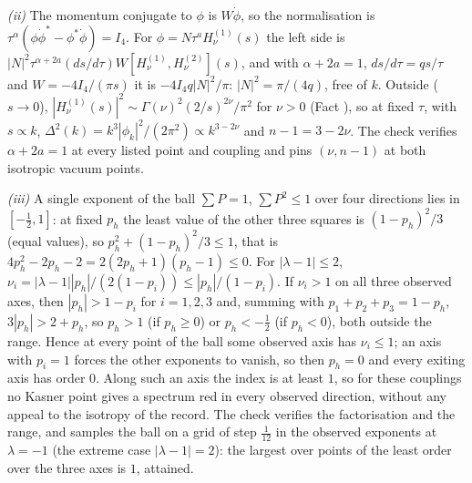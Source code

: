\emph{(ii)} The momentum conjugate to $\phi$ is $W\dot\phi$, so the normalisation is $\tau^{\alpha}(\phi\dot\phi^{*} - \phi^{*}\dot\phi) = I_{4}$. For $\phi = N\tau^{a}H^{(1)}_{\nu}(s)$ the left side is $|N|^{2}\tau^{\alpha + 2a}(ds/d\tau)W[H^{(1)}_{\nu}, H^{(2)}_{\nu}](s)$, and with $\alpha + 2a = 1$, $ds/d\tau = qs/\tau$ and $W = -4I_{4}/(\pi s)$ it is $-4I_{4} q|N|^{2}/\pi$: $|N|^{2} = \pi/(4q)$, free of $k$. Outside ($s \to 0$), $|H^{(1)}_{\nu}(s)|^{2} \sim \Gamma(\nu)^{2}(2/s)^{2\nu}/\pi^{2}$ for $\nu > 0$ (Fact ), so at fixed $\tau$, with $s \propto k$, $\Delta^{2}(k) = k^{3}|\phi_{k}|^{2}/(2\pi^{2}) \propto k^{3 - 2\nu}$ and $n - 1 = 3 - 2\nu$. The check verifies $\alpha + 2a = 1$ at every listed point and coupling and pins $(\nu, n - 1)$ at both isotropic vacuum points.

\emph{(iii)} A single exponent of the ball $\sum P = 1$, $\sum P^{2} \le 1$ over four directions lies in $[-\tfrac12, 1]$: at fixed $p_{h}$ the least value of the other three squares is $(1 - p_{h})^{2}/3$ (equal values), so $p_{h}^{2} + (1 - p_{h})^{2}/3 \le 1$, that is $4p_{h}^{2} - 2p_{h} - 2 = 2(2p_{h} + 1)(p_{h} - 1) \le 0$. For $|\lambda - 1| \le 2$, $\nu_{i} = |\lambda - 1||p_{h}|/(2(1 - p_{i})) \le |p_{h}|/(1 - p_{i})$. If $\nu_{i} > 1$ on all three observed axes, then $|p_{h}| > 1 - p_{i}$ for $i = 1, 2, 3$ and, summing with $p_{1} + p_{2} + p_{3} = 1 - p_{h}$, $3|p_{h}| > 2 + p_{h}$, so $p_{h} > 1$ (if $p_{h} \ge 0$) or $p_{h} < -\tfrac12$ (if $p_{h} < 0$), both outside the range. Hence at every point of the ball some observed axis has $\nu_{i} \le 1$; an axis with $p_{i} = 1$ forces the other exponents to vanish, so then $p_{h} = 0$ and every exiting axis has order $0$. Along such an axis the index is at least $1$, so for these couplings no Kasner point gives a spectrum red in every observed direction, without any appeal to the isotropy of the record. The check verifies the factorisation and the range, and samples the ball on a grid of step $\tfrac{1}{12}$ in the observed exponents at $\lambda = -1$ (the extreme case $|\lambda - 1| = 2$): the largest over points of the least order over the three axes is $1$, attained.

